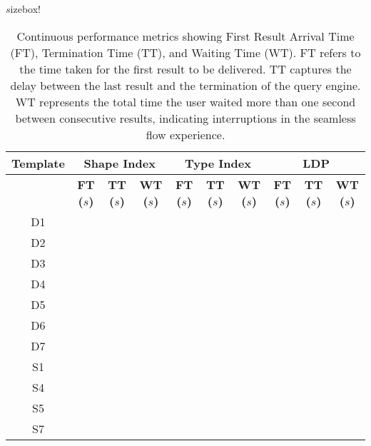 \renewcommand{\arraystretch}{1.1}
\begin{table}[h]
    \centering
    \re$s$izebox{\textwidth}{!}{
    \begin{tabular}{|c|c|c|c||c|c|c||c|c|c|}
        \hline
        \textbf{Template} 
        & \multicolumn{3}{|c||}{\textbf{Shape Index}} 
        & \multicolumn{3}{c||}{\textbf{Type Index}} 
        & \multicolumn{3}{c|}{\textbf{LDP}} \\
        \hline
        & \textbf{FT ($s$)} & \textbf{TT ($s$)} & \textbf{WT ($s$)} 
        & \textbf{FT ($s$)} & \textbf{TT ($s$)} & \textbf{WT ($s$)} 
        & \textbf{FT ($s$)} & \textbf{TT ($s$)} & \textbf{WT ($s$)} \\
        \hline
        D1 & {} & {} & {} & {} & {} & {} & {} & {} & {} \\
        \hline
        D2 & {} & {} & {} & {} & {} & {} & {} & {} & {} \\
        \hline
        D3 & {} & {} & {} & {} & {} & {} & {} & {} & {} \\
        \hline
        D4 & {} & {} & {} & {} & {} & {} & {} & {} & {} \\
        \hline
        D5 & {} & {} & {} & {} & {} & {} & {} & {} & {} \\
        \hline
        D6 & {} & {} & {} & {} & {} & {} & {} & {} & {} \\
        \hline
        D7 & {} & {} & {} & {} & {} & {} & {} & {} & {} \\
        \hline
        S1 & {} & {} & {} & {} & {} & {} & {} & {} & {} \\
        \hline
        S4 & {} & {} & {} & {} & {} & {} & {} & {} & {} \\
        \hline
        S5 & {} & {} & {} & {} & {} & {} & {} & {} & {} \\
        \hline
        S7 & {} & {} & {} & {} & {} & {} & {} & {} & {} \\
        \hline
    \end{tabular}
    }
    \caption{Continuous performance metrics showing First Result Arrival Time (FT), Termination Time (TT), and Waiting Time (WT). FT refers to the time taken for the first result to be delivered.
     TT captures the delay between the last result and the termination of the query engine.
    WT represents the total time the user waited more than one second between consecutive results, indicating interruptions in the seamless flow experience.}
	\label{tab:continuousPerf}
\end{table}
    